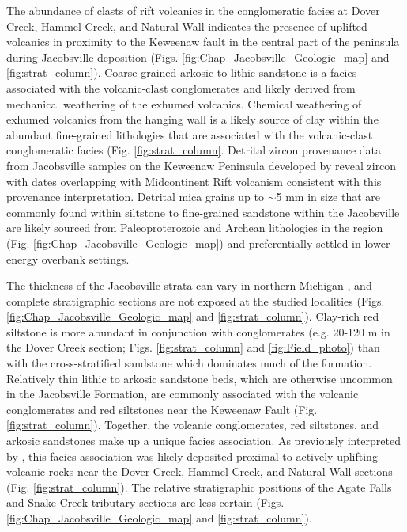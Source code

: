 The abundance of clasts of rift volcanics in the conglomeratic facies at Dover Creek, Hammel Creek, and Natural Wall indicates the presence of uplifted volcanics in proximity to the Keweenaw fault in the central part of the peninsula during Jacobsville deposition (Figs. \ref{fig:Chap_Jacobsville_Geologic_map} and \ref{fig:strat_column}). Coarse-grained arkosic to lithic sandstone is a facies associated with the volcanic-clast conglomerates and likely derived from mechanical weathering of the exhumed volcanics. Chemical weathering of exhumed volcanics from the hanging wall is a likely source of clay within the abundant fine-grained lithologies that are associated with the volcanic-clast conglomeratic facies (Fig. \ref{fig:strat_column}. Detrital zircon provenance data from Jacobsville samples on the Keweenaw Peninsula developed by \cite{Malone2020a} reveal zircon with dates overlapping with Midcontinent Rift volcanism consistent with this provenance interpretation.  Detrital mica grains up to $\sim$5 mm in size that are commonly found within siltstone to fine-grained sandstone within the Jacobsville are likely sourced from Paleoproterozoic and Archean lithologies in the region (Fig. \ref{fig:Chap_Jacobsville_Geologic_map}) and preferentially settled in lower energy overbank settings.

The thickness of the Jacobsville strata can vary in northern Michigan \citep{Hamblin1958a, Kalliokoski1982a}, and complete stratigraphic sections are not exposed at the studied localities (Figs. \ref{fig:Chap_Jacobsville_Geologic_map} and \ref{fig:strat_column}). Clay-rich red siltstone is more abundant in conjunction with conglomerates (e.g. 20-120 m in the Dover Creek section; Figs. \ref{fig:strat_column} and \ref{fig:Field_photo}) than with the cross-stratified sandstone which dominates much of the formation. Relatively thin lithic to arkosic sandstone beds, which are otherwise uncommon in the Jacobsville Formation, are commonly associated with the volcanic conglomerates and red siltstones near the Keweenaw Fault (Fig. \ref{fig:strat_column}). Together, the volcanic conglomerates, red siltstones, and arkosic sandstones make up a unique facies association. As previously interpreted by \cite{Brojanigo1984a}, this facies association was likely deposited proximal to actively uplifting volcanic rocks near the Dover Creek, Hammel Creek, and Natural Wall sections (Fig. \ref{fig:strat_column}). The relative stratigraphic positions of the Agate Falls and Snake Creek tributary sections are less certain (Figs. \ref{fig:Chap_Jacobsville_Geologic_map} and \ref{fig:strat_column}).

